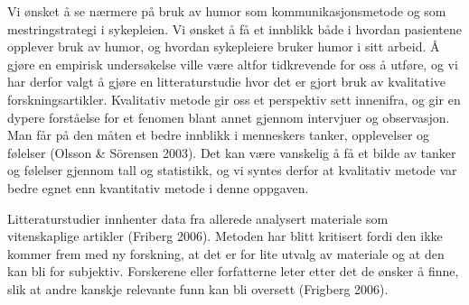 Vi ønsket å se nærmere på bruk av humor som kommunikasjonsmetode og som
mestringstrategi i sykepleien. Vi ønsket å få et innblikk både i hvordan
pasientene opplever bruk av humor, og hvordan sykepleiere bruker humor i sitt
arbeid.  Å gjøre en empirisk undersøkelse ville være altfor tidkrevende for oss
å utføre, og vi har derfor valgt å gjøre en litteraturstudie hvor det er gjort
bruk av kvalitative forskningsartikler.  Kvalitativ metode gir oss et
perspektiv sett innenifra, og gir en dypere forståelse for et fenomen blant
annet gjennom intervjuer og observasjon.  Man får på den måten et bedre
innblikk i menneskers tanker, opplevelser og følelser (Olsson \&{} Sörensen 2003).
Det kan være vanskelig å få et bilde av tanker og følelser gjennom tall og
statistikk, og vi syntes derfor at kvalitativ metode var bedre egnet enn
kvantitativ metode i denne oppgaven.

Litteraturstudier innhenter data fra allerede analysert materiale som
vitenskaplige artikler (Friberg 2006). Metoden har blitt kritisert fordi den
ikke kommer frem med ny forskning, at det er for lite utvalg av materiale og at
den kan bli for subjektiv. Forskerene eller forfatterne leter etter det de
ønsker å finne, slik at andre kanskje relevante funn kan bli oversett (Frigberg
2006).

